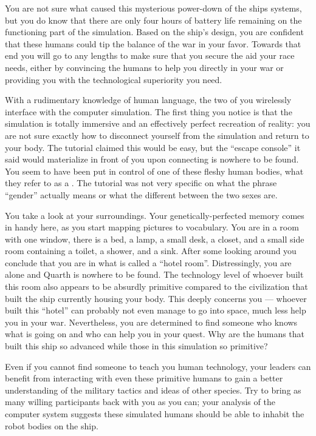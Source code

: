 \documentclass[char]{guildcamp1}
\begin{document}
You are not sure what caused this mysterious power-down of the ships systems, but you do know that there are only four hours of battery life remaining on the functioning part of the simulation.
Based on the ship's design, you are confident that these humans could tip the balance of the war in your favor. Towards that end you will go to any lengths to make sure that you secure the aid your race needs, either by convincing the humans to help you directly in your war or providing you with the technological superiority you need.

With a rudimentary knowledge of human language, the two of you wirelessly interface with the computer simulation. The first thing you notice is that the simulation is totally immersive and an effectively perfect recreation of reality: you are not sure exactly how to disconnect yourself from the simulation and return to your body. The tutorial claimed this would be easy, but the ``escape console'' it said would materialize in front of you upon connecting is nowhere to be found. You seem to have been put in control of one of these fleshy human bodies, what they refer to as a \cActive{\MYsex{}}. The tutorial was not very specific on what the phrase ``gender'' actually means or what the different between the two sexes are.

You take a look at your surroundings. Your genetically-perfected memory comes in handy here, as you start mapping pictures to vocabulary. You are in a room with one window, there is a bed, a lamp, a small desk, a closet, and a small side room containing a toilet, a shower, and a sink. After some looking around you conclude that you are in what is called a ``hotel room''. Distressingly, you are alone and Quarth is nowhere to be found. The technology level of whoever built this room also appears to be absurdly primitive compared to the civilization that built the ship currently housing your body. This deeply concerns you --- whoever built this ``hotel'' can probably not even manage to go into space, much less help you in your war. Nevertheless, you are determined to find someone who knows what is going on and who can help you in your quest. Why are the humans that built this ship so advanced while those in this simulation so primitive?

Even if you cannot find someone to teach you human technology, your leaders can benefit from interacting with even these primitive humans to gain a better understanding of the military tactics and ideas of other species. Try to bring as many willing participants back with you as you can; your analysis of the computer system suggests these simulated humans should be able to inhabit the robot bodies on the ship.
\end{document}
